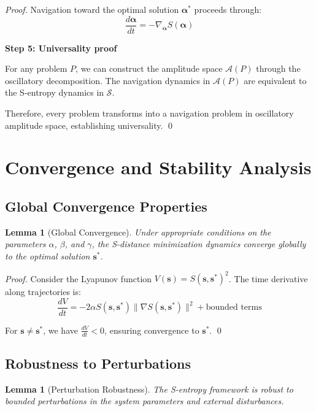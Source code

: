 \documentclass[12pt,a4paper]{article}
\newtheorem{lemma}[theorem]{Lemma}
\begin{document}
\begin{proof}
Navigation toward the optimal solution $\boldsymbol{\alpha}^*$ proceeds through:
\begin{equation}
\frac{d\boldsymbol{\alpha}}{dt} = -\nabla_{\boldsymbol{\alpha}} S(\boldsymbol{\alpha})
\end{equation}

\textbf{Step 5: Universality proof}

For any problem $P$, we can construct the amplitude space $\mathcal{A}(P)$ through the oscillatory decomposition. The navigation dynamics in $\mathcal{A}(P)$ are equivalent to the S-entropy dynamics in $\mathcal{S}$.

Therefore, every problem transforms into a navigation problem in oscillatory amplitude space, establishing universality. \qed
\end{proof}

\section{Convergence and Stability Analysis}

\subsection{Global Convergence Properties}

\begin{lemma}[Global Convergence]
Under appropriate conditions on the parameters $\alpha$, $\beta$, and $\gamma$, the S-distance minimization dynamics converge globally to the optimal solution $\mathbf{s}^*$.
\end{lemma}

\begin{proof}
Consider the Lyapunov function $V(\mathbf{s}) = S(\mathbf{s}, \mathbf{s}^*)^2$. The time derivative along trajectories is:
\begin{equation}
\frac{dV}{dt} = -2\alpha S(\mathbf{s}, \mathbf{s}^*) \|\nabla S(\mathbf{s}, \mathbf{s}^*)\|^2 + \text{bounded terms}
\end{equation}

For $\mathbf{s} \neq \mathbf{s}^*$, we have $\frac{dV}{dt} < 0$, ensuring convergence to $\mathbf{s}^*$. \qed
\end{proof}

\subsection{Robustness to Perturbations}

\begin{lemma}[Perturbation Robustness]
The S-entropy framework is robust to bounded perturbations in the system parameters and external disturbances.
\end{lemma}
\end{document}
